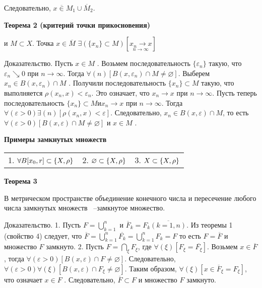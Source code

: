{Следовательно, $x \overline \in M_1 \cup \overline M_2$.


\textbf{Теорема 2 (критерий точки прикосновения)}

\MS и $M \subset X$. Точка $x \in \overline M $ \tttk
$\exists( \{ x_n \} \subset M)[\underset{n \rightarrow \infty  }{x_n \rightarrow x}]$

Доказательство. Пусть $x \in M$ .
Возьмем последовательность  $\{\varepsilon_n\}$ такую,  что
$\varepsilon_n \searrow  0$  при  $n  \to  \infty$.
Тогда  $\forall( n) [ B(x, \varepsilon_n) \cap M   \neq  \varnothing]$.
Выберем $x_n \in B(x, \varepsilon_n) \cap M$ .
Получили последовательность $\{x_n\} \subset M$ такую,
что выполняется $\rho(x_n, x) < \varepsilon_n$.
Это означает, что $x_n \to x$ при $n \to \infty$.
Пусть теперь последовательность $\{x_n\} \subset M и x_n \to x$ при $n \to \infty$.
Тогда  $\forall(\varepsilon  >  0)\exists(n)[ \rho(x_n, x)  <  \varepsilon]$.
Следовательно,  $x_n  \in  B(x, \varepsilon) \cap M $,
то  есть $\forall(\varepsilon > 0)[ B(x, \varepsilon) \cap M  \neq \varnothing]$ и
$x \in M$ .


\textbf{Примеры замкнутых множеств}

\begin{tabular}{c c c}
    1. $\forall B[x_0, r]\subset \{X, \rho\} $ &
    2. $\varnothing \subset \{X, \rho\} $      &
    3. $X \subset \{X, \rho\}$
\end{tabular}


\textbf{Теорема 3}

В метрическом пространстве объединение конечного числа и пересечение любого числа
замкнутых множеств ~--замкнутое множество.

Доказательство. 1. Пусть $F = \bigcup^n_{k=1}	$ и $\overline F_k =
    F_k \overline{(k = 1, n)}$. Из теоремы 1 (свойство 4) следует, что
$\overline F=\bigcup^n_{k=1}\overline{F_k}=\bigcup^n_{k=1}{F_k}=F$
то есть $F = \overline F$ и множество $F$ замкнуто.
2.   Пусть   $F    = \bigcap_\xi F_\xi$,
где   $\forall(\xi) [F_\xi = \overline{F_\xi}]$.
Возьмем   $x    \in  \overline F$ ,   тогда
$\forall(\varepsilon > 0)[ B(x, \varepsilon) \cap F  \neq \varnothing]$.
Следовательно, $\forall(\varepsilon > 0)\forall(\xi)
    [ B(x, \varepsilon) \cap F_\xi  \neq \varnothing]$.
Таким образом, $\forall(\xi)[ x \in \overline F_\xi  =  F_\xi]$,
что означает $x \in F$ . Следовательно, $ \overline F  \subset F$
и множество $F$ замкнуто.

}
